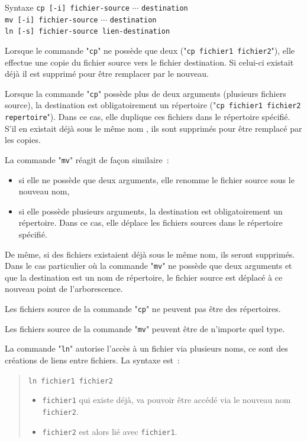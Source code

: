 \begin{definition}{Syntaxe}
{\tt cp [-i] fichier-source} $\cdots$ {\tt destination}\\
{\tt mv [-i] fichier-source} $\cdots$ {\tt destination}\\
{\tt ln [-s] fichier-source lien-destination}
\end{definition}

Lorsque le commande "{\tt cp}" ne poss{\`e}de que deux ("{\tt cp fichier1
fichier2}"), elle effectue une copie du fichier source vers le fichier
destination. Si celui-ci existait d{\'e}j{\`a} il est supprim{\'e} pour {\^e}tre
remplacer par le nouveau.

Lorsque la commande "{\tt cp}" poss{\`e}de plus de deux arguments
(plusieurs fichiers source), la destination est obligatoirement un
r{\'e}pertoire ("{\tt cp fichier1 fichier2 repertoire}"). Dans ce cas,
elle duplique ces fichiers dans le r{\'e}pertoire sp{\'e}cifi{\'e}. S'il en existait
d{\'e}j{\`a} sous le m{\^e}me nom , ils sont supprim{\'e}s pour {\^e}tre remplac{\'e} par les
copies.

La commande "{\tt mv}" r{\'e}agit de fa\c{c}on similaire~:
\begin{itemize}
	\item	si elle ne poss{\`e}de que deux arguments, elle renomme le fichier
			source sous le nouveau nom,
	\item	si elle poss{\`e}de plusieurs arguments, la destination est
			obligatoirement un r{\'e}pertoire. Dans ce cas, elle d{\'e}place les
			fichiers sources dans le r{\'e}pertoire sp{\'e}cifi{\'e}.
\end{itemize}

De m{\^e}me, si des fichiers existaient d{\'e}j{\`a} sous le m{\^e}me nom, ils seront
supprim{\'e}s. Dans le cas particulier o{\`u} la commande "{\tt mv}" ne
poss{\`e}de que deux arguments et que la destination est un nom de
r{\'e}pertoire, le fichier source est d{\'e}plac{\'e} {\`a} ce nouveau point de
l'arborescence.

Les fichiers source de la commande "{\tt cp}" ne peuvent pas {\^e}tre des
r{\'e}pertoires.

Les fichiers source de la commande "{\tt mv}" peuvent {\^e}tre de
n'importe quel type.

La commande "{\tt ln}" autorise l'acc{\`e}s
{\`a} un fichier via plusieurs noms, ce sont des cr{\'e}ations de liens
entre fichiers. La syntaxe est~:
\begin{quote}
\begin{center}
{\tt ln fichier1 fichier2}
\end{center}
\begin{itemize}
	\item {\tt fichier1} qui existe d{\'e}j{\`a}, va pouvoir {\^e}tre acc{\'e}d{\'e} via 
		le nouveau nom {\tt fichier2}. 
	\item {\tt fichier2} est alors li{\'e} avec {\tt fichier1}.
\end{itemize}
\end{quote}

